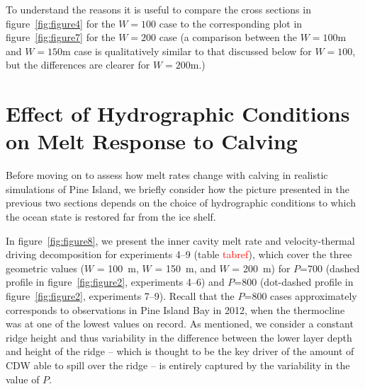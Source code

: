 \documentclass[draft]{agujournal2019}
\newcommand{\red}[1]{\textcolor{red}{#1}}
\begin{document}
To understand the reasons it is useful to compare the cross sections in figure~\ref{fig:figure4} for the $W = 100$ case to the corresponding plot in figure~\ref{fig:figure7} for the $W = 200$ case (a comparison between the $W = 100$m and $W = 150$m case is qualitatively similar to that discussed below for $W = 100$, but the differences are clearer for $W = 200$m.)
%


\section{Effect of Hydrographic Conditions on Melt Response to Calving}\label{S:Results:P}
Before moving on to assess how melt rates change with calving in realistic simulations of Pine Island, we briefly consider how the picture presented in the previous two sections depends on the choice of hydrographic conditions to which the ocean state is restored far from the ice shelf.

In figure~\ref{fig:figure8}, we present the inner cavity melt rate and velocity-thermal driving decomposition for experiments 4--9 (table \red{tabref}), which cover the three geometric values ($W$ = 100~m, $W$ = 150~m, and $W$ = 200~m) for $P$=700 (dashed profile in figure~\ref{fig:figure2}, experiments 4--6) and $P$=800 (dot-dashed profile in figure~\ref{fig:figure2}, experiments 7--9). Recall that the $P$=800 cases approximately corresponds to observations in Pine Island Bay in 2012, when the thermocline was at one of the lowest values on record. As mentioned, we consider a constant ridge height and thus variability in the difference between the lower layer depth and height of the ridge -- which is thought to be the key driver of the amount of CDW able to spill over the ridge -- is entirely captured by the variability in the value of $P$.
\end{document}
